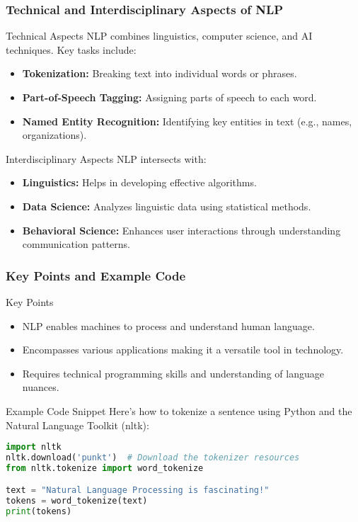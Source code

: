 \documentclass[aspectratio=169]{beamer}
\begin{document}
\begin{frame}[fragile]
    \frametitle{Technical and Interdisciplinary Aspects of NLP}
    \begin{block}{Technical Aspects}
        NLP combines linguistics, computer science, and AI techniques. Key tasks include:
        \begin{itemize}
            \item \textbf{Tokenization:} Breaking text into individual words or phrases.
            \item \textbf{Part-of-Speech Tagging:} Assigning parts of speech to each word.
            \item \textbf{Named Entity Recognition:} Identifying key entities in text (e.g., names, organizations).
        \end{itemize}
    \end{block}
    
    \begin{block}{Interdisciplinary Aspects}
        NLP intersects with:
        \begin{itemize}
            \item \textbf{Linguistics:} Helps in developing effective algorithms.
            \item \textbf{Data Science:} Analyzes linguistic data using statistical methods.
            \item \textbf{Behavioral Science:} Enhances user interactions through understanding communication patterns.
        \end{itemize}
    \end{block}
\end{frame}

\begin{frame}[fragile]
    \frametitle{Key Points and Example Code}
    \begin{block}{Key Points}
        \begin{itemize}
            \item NLP enables machines to process and understand human language.
            \item Encompasses various applications making it a versatile tool in technology.
            \item Requires technical programming skills and understanding of language nuances.
        \end{itemize}
    \end{block}
    
    \begin{block}{Example Code Snippet}
    Here’s how to tokenize a sentence using Python and the Natural Language Toolkit (nltk):
    
    \begin{lstlisting}[language=Python]
import nltk
nltk.download('punkt')  # Download the tokenizer resources
from nltk.tokenize import word_tokenize

text = "Natural Language Processing is fascinating!"
tokens = word_tokenize(text)
print(tokens)
    \end{lstlisting}
    \end{block}
\end{frame}
\end{document}
